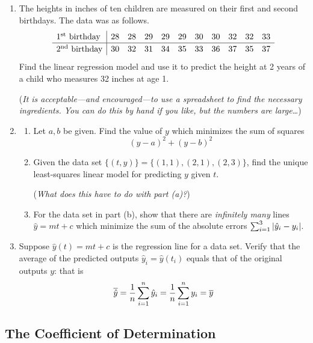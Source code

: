 \begin{exercises}{}{}
\begin{enumerate}
	  
	  \item\label{exs:kidsheights} The heights in inches of ten children are measured on their first and second birthdays. The data was as follows.
	  \[\def\arraystretch{1.2}
	  	\begin{array}{l|cccccccccc}
	  		\text{1\st{} birthday}&28&28&29&29&29&30&30&32&32&33\\\hline
	  		\text{2\nd{} birthday}&30&32&31&34&35&33&36&37&35&37
	  	\end{array}
	  \]
	  Find the linear regression model and use it to predict the height at 2 years of a child who measures 32 inches at age 1.
	  \par
	  (\emph{It is acceptable---and encouraged---to use a spreadsheet to find the necessary ingredients. You can do this by hand if you like, but the numbers are large\ldots})
	  
	  \item\begin{enumerate}
	    \item Let $a,b$ be given. Find the value of $y$ which minimizes the sum of squares
	    \[
	    	(y-a)^2+(y-b)^2
	    \]
	    \item Given the data set $\big\{(t,y)\big\} =\big\{(1,1),(2,1),(2,3)\big\}$, find the unique least-squares linear model for predicting $y$ given $t$.\par
	    (\emph{What does this have to do with part (a)?})
	    \item	For the data set in part (b), show that there are \emph{infinitely many} lines $\hat y=mt+c$ which minimize the sum of the absolute errors $\sum_{i=1}^3\left| \hat y_i-y_i\right|$.
	  \end{enumerate}
	  
	  
	  \item\label{exs:reglinemean} Suppose $\hat y(t)=mt+c$ is the regression line for a data set. Verify that the average of the predicted outputs $\hat y_i=\hat y(t_i)$ equals that of the original outputs $y$: that is
	  \[
	  	\overline{\hat y}=\frac 1n\sum_{i=1}^n\hat y_i=\frac 1n\sum_{i=1}^ny_i=\overline{y}
	  \]
	\end{enumerate}
\end{exercises}



\clearpage


\subsection{The Coefficient of Determination}


